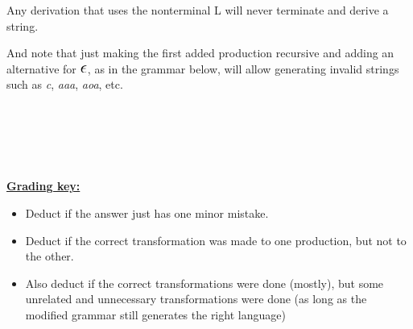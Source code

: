 \documentclass[11pt,fleqn]{article}
\begin{document}
\begin{enumerate}
          Any derivation that uses the nonterminal L will never terminate
          and derive a string.

          And note that just making the first added production recursive and
          adding an alternative for $\mbox{\Large \ensuremath{\epsilon}}$, as in the grammar
          below, will allow generating invalid strings such as \emph{c},
          \emph{aaa}, \emph{aoa}, etc.

          \hspace{.2in}%
          \begin{grammar}[1.35]

              \\

              \\

              \\

              \\

          \end{grammar}

          \begin{info}{\textbf{\underline{Grading key:}}}

            \begin{itemize}

              \addtolength{\itemsep}{1mm}

              \item Deduct  if the answer just has one minor
                    mistake.

              \item Deduct  if the correct transformation was made
                    to one production, but not to the other.

              \item Also deduct  if the correct transformations were
                    done (mostly), but some unrelated and unnecessary
                    transformations were done (as long as the modified
                    grammar still generates the right language)


\end{itemize}
\end{info}
\end{enumerate}
\end{document}
